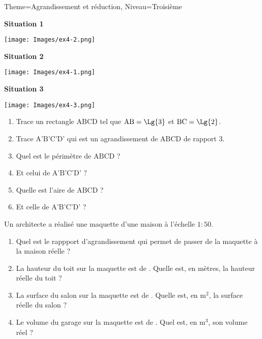 \documentclass[11pt]{article}
\begin{document}
\begin{Maquette}[Fiche]{Theme=Agrandissement et réduction, Niveau=Troisième}
\begin{multicols}{2}
\begin{exercice}
         \textbf{Situation 1}
         \begin{center}
            \texttt{[image: Images/ex4-2.png]}
         \end{center}

         \textbf{Situation 2}
         \begin{center}
            \texttt{[image: Images/ex4-1.png]}
         \end{center}

         \textbf{Situation 3}
         \begin{center}
            \texttt{[image: Images/ex4-3.png]}
         \end{center}
      \end{exercice}
      \begin{exercice}
         \begin{enumerate}
            \item Trace un rectangle $\textrm{ABCD}$ tel que $\textrm{AB} = \Lg{3}$ et $\textrm{BC} = \Lg{2}$.
            \item Trace $\textrm{A’B’C’D’}$ qui est un agrandissement de $\textrm{ABCD}$ de rapport $3$.
            \item Quel est le périmètre de $\textrm{ABCD}$ ?
            \item[] Et celui de $\textrm{A’B’C’D’}$ ?
            \item Quelle est l’aire de $\textrm{ABCD}$ ?
            \item[] Et celle de $\textrm{A’B’C’D’}$ ?
         \end{enumerate}
      \end{exercice}
      \columnbreak
      \begin{exercice}
         Un architecte a réalisé une maquette d’une maison à l’échelle $1:50$.
         \begin{enumerate}
            \item Quel est le rappport d’agrandissement qui permet de passer de la maquette à la maison réelle ?
            \item La hauteur du toit sur la maquette est de . Quelle est, en mètres, la hauteur réelle du toit ?
            \item La surface du salon sur la maquette est de . Quelle est, en $\textrm{m}^2$, la surface réelle du salon ?
            \item Le volume du garage sur la maquette est de . Quel est, en $\textrm{m}^3$, son volume réel ?
         \end{enumerate}

      \end{exercice}
   \end{multicols}
\end{Maquette}
\end{document}
